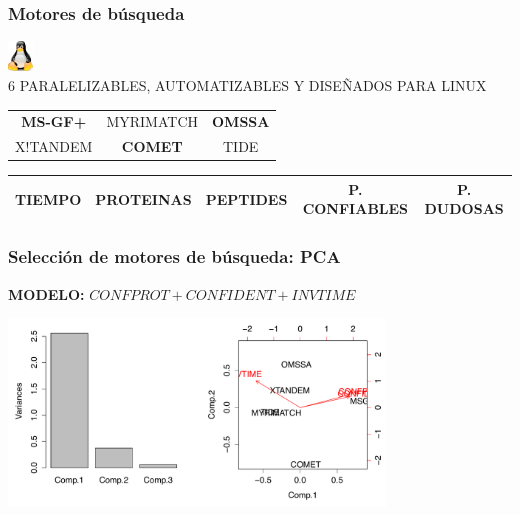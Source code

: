 \documentclass[10pt]{beamer}
\begin{document}
\begin{frame}
\frametitle{Motores de búsqueda}
\begin{center}
\includegraphics[height=0.8cm]{imagenes/logo_linux}\\
6 PARALELIZABLES, AUTOMATIZABLES Y DISEÑADOS PARA LINUX\\
\end{center}
\pause
\begin{center}
\begin{tabular}{ccc}
{\huge \textbf{MS-GF+}}&{\huge MYRIMATCH}&{\huge \textbf{OMSSA}}\\
{\huge X!TANDEM}&{\huge \textbf{COMET}}&{\huge TIDE}\\
\end{tabular}
\end{center}
\pause
\begin{center}
\begin{tabular}{|c|c|c|c|c|}
\hline
TIEMPO&PROTEINAS&PEPTIDES&P. CONFIABLES & P. DUDOSAS\\
\hline
\end{tabular}
\end{center}
\end{frame}
\begin{frame}
\frametitle{Selección de motores de búsqueda: PCA}
\begin{center}
\textbf{MODELO:} $CONFPROT + CONFIDENT + INVTIME$
\end{center}
\begin{center}
\includegraphics[width=10cm]{imagenes/PCA}
\end{center}
\end{frame}
\end{document}
